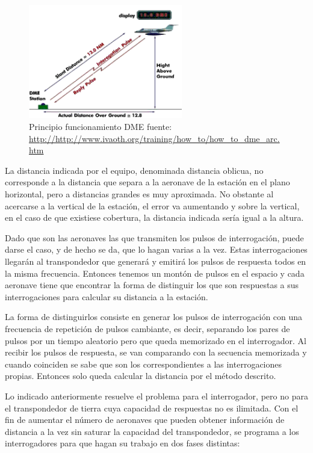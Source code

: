 \begin{figure}[!h]
  \centering
  \includegraphics[width=0.6\textwidth]{Imagenes/06.04.dme.imagenes/how_to_dme_arc_Picture1.gif}
  \caption{Principio funcionamiento DME {\tiny fuente: \url{http://http://www.ivaoth.org/training/how_to/how_to_dme_arc.htm}}}
  \label{fig:DME.principio.funcionamiento}
\end{figure}

La distancia indicada por el equipo, denominada distancia oblicua, no corresponde a la distancia que separa a la aeronave de la estaci\'on en el plano horizontal, pero a distancias grandes es muy aproximada. No obstante al acercarse a la vertical de la estaci\'on, el error va aumentando y sobre la vertical, en el caso de que existiese cobertura, la distancia indicada ser\'ia igual a la altura.

Dado que son las aeronaves las que transmiten los pulsos de interrogaci\'on, puede darse el caso, y de hecho se da, que lo hagan varias a la vez. Estas interrogaciones llegar\'an al transpondedor que generar\'a y emitir\'a los pulsos de respuesta todos en la misma frecuencia. Entonces tenemos un mont\'on de pulsos en el espacio y cada aeronave tiene que encontrar la forma de distinguir los que son respuestas a sus interrogaciones para calcular su distancia a la estaci\'on.

La forma de distinguirlos consiste en generar los pulsos de interrogaci\'on con una frecuencia de repetici\'on de pulsos cambiante, es decir, separando los pares de pulsos por un tiempo aleatorio pero que queda memorizado en el interrogador. Al recibir los pulsos de respuesta, se van comparando con la secuencia memorizada y cuando coinciden se sabe que son los correspondientes a las interrogaciones propias. Entonces solo queda calcular la distancia por el m\'etodo descrito.

Lo indicado anteriormente resuelve el problema para el interrogador, pero no para el transpondedor de tierra cuya capacidad de respuestas no es ilimitada. Con el fin de aumentar el n\'umero de aeronaves que pueden obtener informaci\'on de distancia a la vez sin saturar la capacidad del transpondedor, se programa a los interrogadores para que hagan su trabajo en dos fases distintas:

